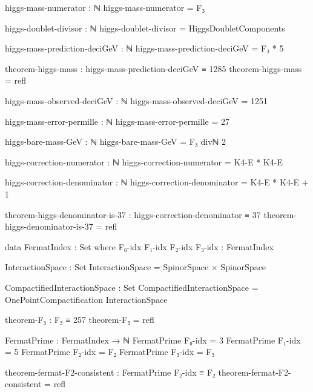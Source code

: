 \documentclass[11pt,a4paper]{book}
\begin{document}
\begin{code}
higgs-mass-numerator : ℕ
higgs-mass-numerator = F₃

higgs-doublet-divisor : ℕ
higgs-doublet-divisor = HiggsDoubletComponents
\end{code}

\begin{code}
higgs-mass-prediction-deciGeV : ℕ
higgs-mass-prediction-deciGeV = F₃ * 5

theorem-higgs-mass : higgs-mass-prediction-deciGeV ≡ 1285
theorem-higgs-mass = refl
\end{code}

\begin{code}
higgs-mass-observed-deciGeV : ℕ
higgs-mass-observed-deciGeV = 1251
\end{code}

\begin{code}
higgs-mass-error-permille : ℕ
higgs-mass-error-permille = 27
\end{code}

\begin{code}
higgs-bare-mass-GeV : ℕ
higgs-bare-mass-GeV = F₃ divℕ 2

higgs-correction-numerator : ℕ
higgs-correction-numerator = K4-E * K4-E

higgs-correction-denominator : ℕ
higgs-correction-denominator = K4-E * K4-E + 1

theorem-higgs-denominator-is-37 : higgs-correction-denominator ≡ 37
theorem-higgs-denominator-is-37 = refl

data FermatIndex : Set where
  F₀-idx F₁-idx F₂-idx F₃-idx : FermatIndex
\end{code}

\begin{code}
InteractionSpace : Set
InteractionSpace = SpinorSpace × SpinorSpace

CompactifiedInteractionSpace : Set
CompactifiedInteractionSpace = OnePointCompactification InteractionSpace

theorem-F₃ : F₃ ≡ 257
theorem-F₃ = refl

FermatPrime : FermatIndex → ℕ
FermatPrime F₀-idx = 3
FermatPrime F₁-idx = 5
FermatPrime F₂-idx = F₂
FermatPrime F₃-idx = F₃

theorem-fermat-F2-consistent : FermatPrime F₂-idx ≡ F₂
theorem-fermat-F2-consistent = refl
\end{code}
\end{document}
